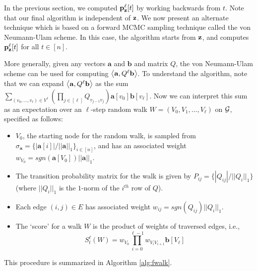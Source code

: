 In the previous section, we computed ${\mathbf{p}}_\mathbf{z}^{\ell}[t]$ by working backwards from $t$. 
Note that our final algorithm is independent of $\mathbf{z}$.
We now present an alternate technique which is based on a forward MCMC sampling technique called the von Neumann-Ulam scheme. 
In this case, the algorithm starts from $\mathbf{z}$, and computes ${\mathbf{p}}_\mathbf{z}^{\ell}[t]$ for all $t\in[n]$.

More generally, given any vectors $\mathbf{a}$ and $\mathbf{b}$ and matrix $Q$, the von Neumann-Ulam scheme can be used for computing $\left< \mathbf{a}, Q^{\ell}\mathbf{b} \right>$.
To understand the algorithm, note that we can expand $\left< \mathbf{a}, Q^{\ell}\mathbf{b} \right>$ as the sum $\sum_{(v_0,\ldots, v_{\ell}) \in V^{\ell}}\left(\prod_{j \in [{\ell}]} Q_{v_{j-1}v_{j}} \right) \mathbf{a}[v_0] \mathbf{b}[v_{\ell}]$. 
Now we can interpret this sum as an expectation over an ${\ell}$-step random walk $W = (V_0,V_1,\ldots,V_{\ell})$ on ${\mathcal{G}}$, specified as follows:
\begin{itemize}
\item $V_0$, the starting node for the random walk, is sampled from $\sigma_{\mathbf{a}} = \{|\mathbf{a}[i]|/||\mathbf{a}||_1\}_{i\in [n]}$, and has an associated weight $w_{V_0} = sgn(\mathbf{a}[V_0])||\mathbf{a}||_1$.
\item The transition probability matrix for the walk is given by $P_{ij} = \{|Q_{ij}|/||Q_i||_1\}$ (where $||Q_i||_1$ is the $1$-norm of the $i^{th}$ row of $Q$).
\item Each edge $(i,j)\in E$ has associated weight $w_{ij} = sgn(Q_{ij})||Q_i||_1$. 
\item The `score' for a walk $W$ is the product of weights of traversed edges, i.e.,
$$S_t^{\ell}(W) = w_{V_0}\prod_{i=0}^{{\ell}-1}w_{V_iV_{i+1}}\mathbf{b}[V_{\ell}]$$
\end{itemize}
This procedure is summarized in Algorithm \ref{alg:fwalk}. 

